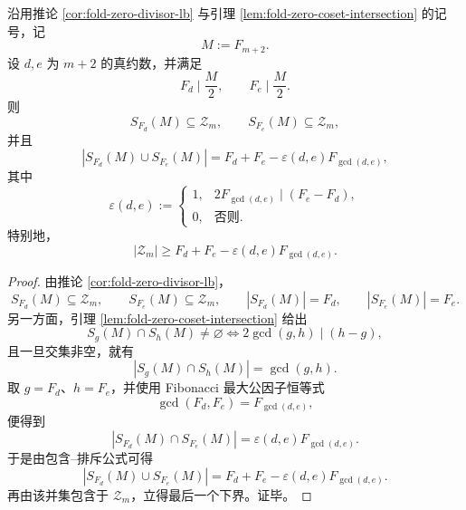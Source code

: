 \begin{theorem}\label{thm:xi-fold-zero-divisor-two-class-inclusion-exclusion}
沿用推论 \ref{cor:fold-zero-divisor-lb} 与引理 \ref{lem:fold-zero-coset-intersection} 的记号，记
\[
M:=F_{m+2}.
\]
设 \(d,e\) 为 \(m+2\) 的真约数，并满足
\[
F_d\mid \frac{M}{2},
\qquad
F_e\mid \frac{M}{2}.
\]
则
\[
S_{F_d}(M)\subseteq \mathcal Z_m,
\qquad
S_{F_e}(M)\subseteq \mathcal Z_m,
\]
并且
\[
\left|S_{F_d}(M)\cup S_{F_e}(M)\right|
=
F_d+F_e-\varepsilon(d,e)F_{\gcd(d,e)},
\]
其中
\[
\varepsilon(d,e):=
\begin{cases}
1,& 2F_{\gcd(d,e)}\mid(F_e-F_d),\\
0,& \text{否则}.
\end{cases}
\]
特别地，
\[
|\mathcal Z_m|
\ge
F_d+F_e-\varepsilon(d,e)F_{\gcd(d,e)}.
\]
\end{theorem}
\begin{proof}
由推论 \ref{cor:fold-zero-divisor-lb}，
\[
S_{F_d}(M)\subseteq \mathcal Z_m,
\qquad
S_{F_e}(M)\subseteq \mathcal Z_m,
\qquad
|S_{F_d}(M)|=F_d,
\qquad
|S_{F_e}(M)|=F_e.
\]
另一方面，引理 \ref{lem:fold-zero-coset-intersection} 给出
\[
S_g(M)\cap S_h(M)\neq\varnothing
\iff
2\gcd(g,h)\mid(h-g),
\]
且一旦交集非空，就有
\[
|S_g(M)\cap S_h(M)|=\gcd(g,h).
\]
取 \(g=F_d\)、\(h=F_e\)，并使用 Fibonacci 最大公因子恒等式
\[
\gcd(F_d,F_e)=F_{\gcd(d,e)},
\]
便得到
\[
\left|S_{F_d}(M)\cap S_{F_e}(M)\right|
=
\varepsilon(d,e)F_{\gcd(d,e)}.
\]
于是由包含--排斥公式可得
\[
\left|S_{F_d}(M)\cup S_{F_e}(M)\right|
=
F_d+F_e-\varepsilon(d,e)F_{\gcd(d,e)}.
\]
再由该并集包含于 \(\mathcal Z_m\)，立得最后一个下界。证毕。
\end{proof}




